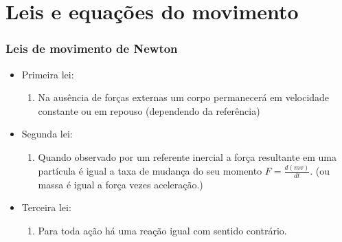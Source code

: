 \section{Leis e equações do movimento}

\begin{frame}
\frametitle{Leis de movimento de Newton}

  \begin{itemize}[<+-| alert@+>]
    \item Primeira lei:
      \begin{enumerate}[<+-| alert@+>]
        \item Na ausência de forças externas um corpo permanecerá em velocidade constante ou em repouso (dependendo da referência)
      \end{enumerate}
    \item Segunda lei:
      \begin{enumerate}[<+-| alert@+>]
        \item Quando observado por um referente inercial a força resultante
              em uma partícula é igual a taxa de mudança do seu momento
              $F = \frac{d(mv)}{dt}$.
              \pause (ou massa é igual a força vezes aceleração.)
      \end{enumerate}
    \item Terceira lei:
      \begin{enumerate}[<+-| alert@+>]
        \item Para toda ação há uma reação igual com sentido contrário.
      \end{enumerate}
  \end{itemize}

\end{frame}


